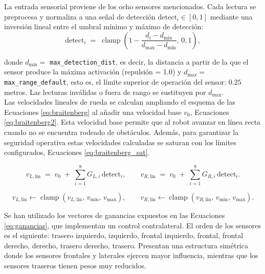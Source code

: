 La entrada sensorial proviene de los ocho sensores mencionados.
Cada lectura se preprocesa y normaliza a una señal de detección
 \(\mathrm{detect}_i\in[0,1]\) mediante una inversión lineal entre el umbral mínimo
 y máximo de detección:
\begin{equation}
\mathrm{detect}_i \;=\; \operatorname{clamp}\!\left(1 - \frac{d_i - d_{\min}}{d_{\max}-d_{\min}},\,0,1\right),
\label{eq:detect}
\end{equation}

donde \(d_{\min}=\) \texttt{max\_detection\_dist}, es decir,
la distancia a partir de la que el sensor produce la máxima activación (repulsión = 1.0)
y \(d_{\max}=\) \texttt{max\_range\_default}, esto es, el límite superior de operación
del sensor: $0.25$ metros. 
Las lecturas inválidas o fuera de rango se sustituyen por \(d_{\max}\). \\


Las velocidades lineales de rueda se calculan ampliando el esquema de las 
Ecuaciones \ref{eq:braitenberg} al añadir una velocidad base \(v_0\), Ecuaciones
\ref{eq:braitenberg2}. Esta velocidad base permite que al robot avanzar en línea 
recta cuando no se encuentra rodeado de obstáculos. Además, para garantizar la 
seguridad operativa estas velocidades calculadas
se saturan con los límites configurados, Ecuaciones \ref{eq:braitenberg_sat}.

\begin{equation}
v_{L,\text{lin}} \;=\; v_0 \;+\; \sum_{i=1}^{8} G_{L,i}\,\mathrm{detect}_i,\qquad
v_{R,\text{lin}} \;=\; v_0 \;+\; \sum_{i=1}^{8} G_{R,i}\,\mathrm{detect}_i.
\label{eq:braitenberg2}
\end{equation}

\begin{equation}
v_{L,\text{lin}} \leftarrow \operatorname{clamp}(v_{L,\text{lin}},\, v_{\min},\, v_{\max}),\qquad
v_{R,\text{lin}} \leftarrow \operatorname{clamp}(v_{R,\text{lin}},\, v_{\min},\, v_{\max}).
\label{eq:braitenberg_sat}
\end{equation} 

Se han utilizado los vectores de ganancias expuestos en las Ecuaciones \ref{eq:ganancias},
que implementan un control contralateral. El orden de los sensores es el siguiente:
trasero izquierdo, izquierdo, frontal izquierdo, frontal, frontal derecho,
derecho, trasero derecho, trasero. Presentan una estructura simétrica donde 
los sensores frontales y laterales ejercen mayor influencia, 
mientras que los sensores traseros tienen pesos muy reducidos. \\

